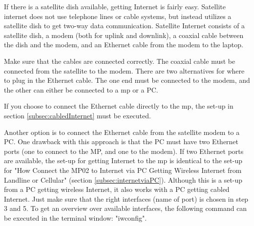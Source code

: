 If there is a satellite dish available, getting Internet is fairly easy. Satellite internet does not use telephone lines or cable systems, but instead utilizes a  satellite dish to get two-way data communication. Satellite Internet consists of a satellite dish, a modem (both for uplink and downlink), a coaxial cable between the dish and the modem, and an Ethernet cable from the modem to the laptop. 

Make sure that the cables are connected correctly. The coaxial cable must be connected from the satellite to the modem. There are two alternatives for where to plug in the Ethernet cable. The one end must be connected to the modem, and the other can either be connected to a \gls{mp} or a PC.

If you choose to connect the Ethernet cable directly to the \gls{mp}, the set-up in section \ref{subsec:cabledInternet} must be executed. 

Another option is to connect the Ethernet cable from the satellite modem to a PC. One drawback with this approach is that the PC must have two Ethernet ports (one to connect to the MP, and one to the modem). If two Ethernet ports are available, the set-up for getting Internet to the \gls{mp} is identical to the set-up for "How Connect the MP02 to Internet via PC Getting Wireless Internet from Landline or Cellular" (section \ref{subsec:internetviaPC}). Although this is a set-up from a PC getting wireless Internet, it also works with a PC getting cabled Internet. Just make sure that the right interfaces (name of port) is chosen in step 3 and 5. To get an overview over available interfaces, the following command can be executed in the terminal window: "iwconfig". 



